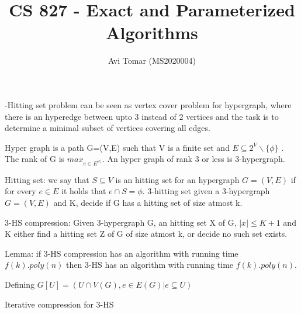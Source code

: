 \documentclass{homeworg}
\title{CS 827 - Exact and Parameterized Algorithms}
\author{Avi Tomar (MS2020004)}
\begin{document}
\maketitle

-Hitting set problem can be seen as vertex cover problem for hypergraph, where there is an hyperedge between upto 3 instead of 2 vertices and the task is to determine a minimal subset of vertices covering all edges.

Hyper graph is a path G=(V,E) such that V is a finite set and $E \subseteq 2^V \backslash \{ \phi \}$ . The rank of G is $max_{e \in E^|e|}$. An hyper graph of rank 3 or less is 3-hypergraph.

Hitting set: we say that $S \subseteq V$ is an hitting set for an hypergraph $G=(V,E)$ if for every $e \in E$ it holds that $ e \cap S = \phi$.
3-hitting set given a 3-hypergraph $G=(V,E)$ and K, decide if G has a hitting set of size atmost k.

3-HS compression: Given 3-hypergraph G, an hitting set X of G, $|x| \leq K+1$ and K either find a hitting set Z of G of size atmost k, or decide no such set exists.

Lemma: if 3-HS compression has an algorithm with running time $f(k).poly(n)$ then 3-HS has an algorithm with running time $f(k).poly(n)$.

Defining $G[U]=(U \cap V(G), {e \in E(G) | e \subseteq U})$

Iterative compression for 3-HS
\end{document}
